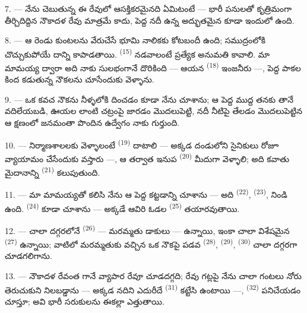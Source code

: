 \VUsaut{5.0mm}
\VUsaut{3.4mm}

7. --- నేను చెబుతున్న ఈ రేవులో ఆసక్తికరమైనది ఏమిటంటే — భారీ పనులతో కృత్రిమంగా తీర్చిదిద్దిన
నౌకాదళ రేవు మాత్రమే కాదు, పెద్ద నదీ  ఉన్న అద్భుతమైన
 కూడా ఇందులో ఉంది.

8. --- ఆ రెండు కుంటలను వేరుచేసే భూమి నాలికకు కోటబందీ ఉంది; సముద్రంలోకి చొచ్చుకుపోయే
  దాన్ని కాపాడతాయి. 
\textsuperscript{(15)} నడవాలంటే ప్రత్యేక అనుమతి కావాలి. మా మామయ్య ద్వారా అది నాకు సులభంగానే
దొరికింది — ఆయన  \textsuperscript{(18)} ఇంజనీరు —, పెద్ద పాకల కింద
కడుతున్న నౌకలను చూసేందుకు వెళ్ళాను.

9. --- ఒక కవచ నౌకను నీళ్ళలోకి దించడం కూడా నేను చూశాను; ఆ పెద్ద ముద్ద తనకు తానే
వదిలేయబడి, ఊయల లాంటి చట్రంపై జారడం మొదలుపెట్టి, నదీ నీటిపై తేలడం మొదలుపెట్టిన ఆ క్షణంలో
జనమంతా పొందిన ఉద్వేగం నాకు గుర్తుంది.

10. --- నిర్మాణశాలలకు వెళ్ళాలంటే  \textsuperscript{(19)} దాటాలి — అక్కడ
దండులోని సైనికులు రోజూ వ్యాయామం చేసేందుకు వస్తారు —, ఆ తర్వాత ఇనుప 
\textsuperscript{(20)} మీదుగా వెళ్ళాలి; అది కవాతు మైదానాన్ని 
\textsuperscript{(21)} కలుపుతుంది.

\VUsaut{5.0mm}
\VUsaut{3.4mm}

11. --- మా మామయ్యతో కలిసి నేను ఆ పెద్ద కట్టడాన్ని చూశాను — అది 
\textsuperscript{(22)},  \textsuperscript{(23)}, 
నిండి ఉంది.  \textsuperscript{(24)} కూడా చూశాను — అక్కడే ఆవిరి
ఓడల  \textsuperscript{(25)} తయారవుతాయి.

12. --- చాలా దగ్గరలోనే  \textsuperscript{(26)} — మరమ్మతు డాకులు — ఉన్నాయి,
ఇంకా చాలా విశేషమైన  \textsuperscript{(27)} ఉన్నాయి; వాటిలో మరమ్మతుకు
వచ్చిన ఒక నౌకపై పడవ  \textsuperscript{(28)}, 
\textsuperscript{(29)},  \textsuperscript{(30)} చాలా దగ్గరగా చూడగలిగాను.

13. --- నౌకాదళ రేవంత గానే వ్యాపార రేవూ చూడదగ్గది; రేవు గట్లపై నేను చాలా గంటలు నోరు
తెరుచుకుని నిలబడ్డాను — అక్కడ నదిని ఎదురీదే 
\textsuperscript{(31)} కట్టేసి ఉంటాయి —, 
\textsuperscript{(32)} పనిచేయడం చూస్తూ; అవి భారీ సరుకులను ఈకల్లా ఎత్తుతాయి.

